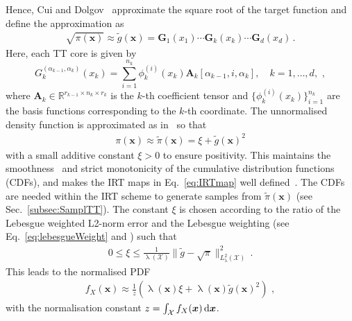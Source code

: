 Hence, Cui and Dolgov~\cite{cui2022deep} approximate the square root of the target function and 
define the approximation as \cite[Eq.~18]{cui2022deep}
\begin{align}
	\sqrt{\pi(\bm{x})} \approx \tilde{g}(\bm{x}) = \bm{G}_1(x_1) \cdots \bm{G}_k(x_k) \cdots \bm{G}_d(x_d)\, .
\end{align}
Here, each TT core is given by \cite[Eq.~21]{cui2022deep}
\begin{equation}
	G^{(\alpha_{k-1},\alpha_k)}_k(x_k) = \sum_{i=1}^{n_k} \phi^{(i)}_k(x_k) \bm{A}_k[\alpha_{k-1}, i, \alpha_k], \quad k = 1, \dots, d,\, \,  ,
\end{equation}
where $\bm{A}_k \in \mathbb{R}^{r_{k-1} \times n_k \times r_k}$ is the $k$-th coefficient tensor and $\{\phi^{(i)}_k(x_k)\}_{i=1}^{n_k}$ are the basis functions corresponding to the $k$-th coordinate.
The unnormalised density function is approximated as in~\cite[Eq.~19]{cui2022deep} so that
\begin{align}
	\pi(\bm{x}) \approx \tilde{\pi}(\bm{x}) = \xi + \tilde{g}(\bm{x})^2 \label{eq:SQTTapprox}
\end{align}
with a small additive constant $\xi > 0$ to ensure positivity.
This maintains the smoothness~\cite{cui2022deep} and strict monotonicity of the cumulative distribution functions (CDFs), and makes the IRT maps in Eq.~\ref{eq:IRTmap} well defined~\cite{foxRosen21}.
The CDFs are needed within the IRT scheme to generate samples from $\tilde{\pi}(\bm{x})$ (see Sec.~\ref{subsec:SamplTT}).
The constant $\xi$ is chosen according to the ratio of the Lebesgue weighted L2-norm error and the Lebesgue weighting (see Eq.~\ref{eq:lebesgueWeight} and \cite[Eq.~35]{cui2022deep}) such that 
\begin{align}
	0 \leq \xi \leq \frac{1}{\uplambda(\mathcal{X})} \lVert \tilde{g} - \sqrt{\pi} \rVert_{L^2_{\uplambda}(\mathcal{X})}^2\,  \label{eq:gamErr}.
\end{align}
This leads to the normalised PDF \cite[Eq.~19]{cui2022deep}
\begin{align}
	f_X(\bm{x})  \approx \frac{1}{z} \left( \uplambda(\bm{x}) \xi  + \uplambda(\bm{x}) \tilde{g}(\bm{x})^2 \right)\, \, ,
\end{align}
with the normalisation constant $z = \int_{\mathcal{X}} f_X(\bm{x}) \mathop{}\!\mathrm{d} \bm{x} $.
